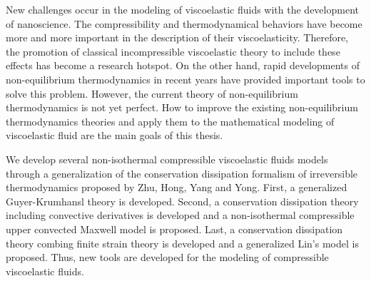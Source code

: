 \begin{eabstract}
  \noindent New challenges occur in the modeling of viscoelastic fluids with the development of nanoscience. The compressibility and thermodynamical behaviors have become more and more important in the description of their viscoelasticity. Therefore, the promotion of classical incompressible viscoelastic theory to include these effects has become a research hotspot. On the other hand, rapid developments of non-equilibrium thermodynamics in recent years have provided important tools to solve this problem. However, the current theory of non-equilibrium thermodynamics is not yet perfect. How to improve the existing non-equilibrium thermodynamics theories and apply them to the mathematical modeling of viscoelastic fluid are the main goals of this thesis.

  
 We develop several non-isothermal compressible viscoelastic fluids models through a generalization of the conservation dissipation formalism of irreversible thermodynamics proposed by Zhu, Hong, Yang and Yong. First, a generalized Guyer-Krumhansl theory is developed. Second, a conservation dissipation theory including convective derivatives is developed and a non-isothermal compressible upper convected Maxwell model is proposed. Last, a conservation dissipation theory combing finite strain theory is developed and a generalized Lin's model is proposed. Thus, new tools are developed for the modeling of compressible viscoelastic fluids.



\end{eabstract}
